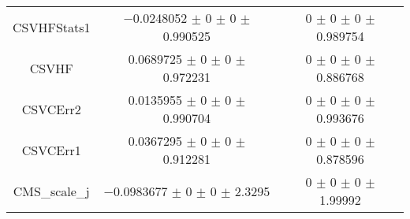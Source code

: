 \begin{table}
\begin{tabular}{ccc}
CSVHFStats1 & \num{-0.0248052} $\pm$ \num{0} $\pm$ \num{0} $\pm$ \num{0.990525} & \num{0} $\pm$ \num{0} $\pm$ \num{0} $\pm$ \num{0.989754}\\
CSVHF & \num{0.0689725} $\pm$ \num{0} $\pm$ \num{0} $\pm$ \num{0.972231} & \num{0} $\pm$ \num{0} $\pm$ \num{0} $\pm$ \num{0.886768}\\
CSVCErr2 & \num{0.0135955} $\pm$ \num{0} $\pm$ \num{0} $\pm$ \num{0.990704} & \num{0} $\pm$ \num{0} $\pm$ \num{0} $\pm$ \num{0.993676}\\
CSVCErr1 & \num{0.0367295} $\pm$ \num{0} $\pm$ \num{0} $\pm$ \num{0.912281} & \num{0} $\pm$ \num{0} $\pm$ \num{0} $\pm$ \num{0.878596}\\
CMS\_scale\_j & \num{-0.0983677} $\pm$ \num{0} $\pm$ \num{0} $\pm$ \num{2.3295} & \num{0} $\pm$ \num{0} $\pm$ \num{0} $\pm$ \num{1.99992}\\
\bottomrule
\end{tabular}
\end{table}